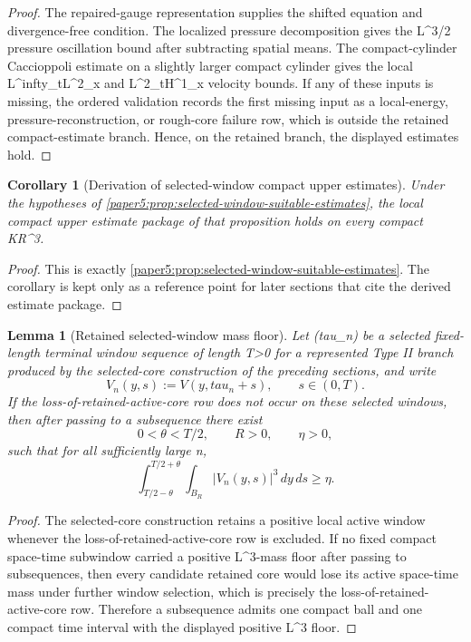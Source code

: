 \documentclass[11pt]{amsart}
\def\({}%
\def\){}%
\def\mathbb#1{#1}%
\def\tau{tau}%
\def\infty{infty}%
\theoremstyle{plain}
\newtheorem{lemma}[lemma]{Lemma}
\newtheorem{corollary}[corollary]{Corollary}
\theoremstyle{definition}
\theoremstyle{remark}
\begin{document}
\begin{proof}
The repaired-gauge representation supplies the shifted equation and
divergence-free condition.  The localized pressure decomposition gives the
\(L^{3/2}\) pressure oscillation bound after subtracting spatial means.  The
compact-cylinder Caccioppoli estimate on a slightly larger compact cylinder
gives the local \(L^\infty_tL^2_x\) and \(L^2_tH^1_x\) velocity bounds.  If any
of these inputs is missing, the ordered validation records the first missing
input as a local-energy, pressure-reconstruction, or rough-core failure row,
which is outside the retained compact-estimate branch.  Hence, on the retained
branch, the displayed estimates hold.
\end{proof}

\begin{corollary}[Derivation of selected-window compact upper estimates]
\label{paper5:prop:selected-window-derived}
Under the hypotheses of
\cref{paper5:prop:selected-window-suitable-estimates}, the local compact upper
estimate package of that proposition holds on every compact
\(K\Subset\mathbb R^3\).
\end{corollary}

\begin{proof}
This is exactly \cref{paper5:prop:selected-window-suitable-estimates}.  The
corollary is kept only as a reference point for later sections that cite the
derived estimate package.
\end{proof}

\begin{lemma}[Retained selected-window mass floor]
\label{paper5:lem:selected-window-mass-floor}
\label{paper5:lem:retained-selected-window-mass-floor}
Let \((\tau_n)\) be a selected fixed-length terminal window sequence of length
\(T>0\) for a represented Type II branch produced by the selected-core
construction of the preceding sections, and write
\[
  V_n(y,s):=V(y,\tau_n+s),\qquad s\in(0,T).
\]
If the loss-of-retained-active-core row does not occur on these selected
windows, then after passing to a subsequence there exist
\[
  0<\theta<T/2,\qquad R>0,\qquad \eta>0,
\]
such that for all sufficiently large \(n\),
\[
  \int_{T/2-\theta}^{T/2+\theta}\int_{B_R}|V_n(y,s)|^3\,dy\,ds\ge\eta .
\]
\end{lemma}

\begin{proof}
The selected-core construction retains a positive local active window whenever
the loss-of-retained-active-core row is excluded.  If no fixed compact
space-time subwindow carried a positive \(L^3\)-mass floor after passing to
subsequences, then every candidate retained core would lose its active
space-time mass under further window selection, which is precisely the
loss-of-retained-active-core row.  Therefore a subsequence admits one compact
ball and one compact time interval with the displayed positive \(L^3\) floor.
\end{proof}
\end{document}
